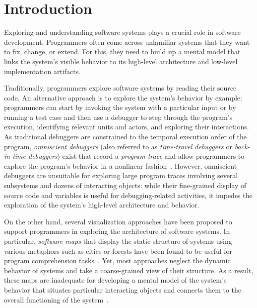 \section{Introduction}
\label{sec:introduction}

Exploring and understanding software systems plays a crucial role in software development.
Programmers often come across unfamiliar systems that they want to fix, change, or extend.
For this, they need to build up a mental model that links the system's visible behavior to its high-level architecture and low-level implementation artifacts.

Traditionally, programmers explore software systems by reading their source code.
An alternative approach is to explore the system's behavior by example:
programmers can start by invoking the system with a particular input or by running a test case and then use a debugger to step through the program's execution, identifying relevant units and actors, and exploring their interactions.
As traditional debuggers are constrained to the temporal execution order of the program, \emph{omniscient debuggers} (also referred to as \emph{time-travel debuggers} or \emph{back-in-time debuggers}) exist that record a \emph{program trace} and allow programmers to explore the program's behavior in a nonlinear fashion~\cite{lewis2003debugging,hofer2006design,pothier2009back,lienhard2008practical}.
However, omniscient debuggers are unsuitable for exploring large program traces involving several subsystems and dozens of interacting objects:
while their fine-grained display of source code and variables is useful for debugging-related activities, it impedes the exploration of the system's high-level architecture and behavior.

On the other hand, several visualization approaches have been proposed to support programmers in exploring the architecture of software systems.
In particular, \emph{software maps} that display the static structure of systems using various metaphors such as cities or forests have been found to be useful for program comprehension tasks~\cite{wettel2007visualizing,atzberger2021softwareforest,limberger2022visual}.
Yet, most approaches neglect the dynamic behavior of systems and take a coarse-grained view of their structure.
As a result, these maps are inadequate for developing a mental model of the system's behavior that situates particular interacting objects and connects them to the overall functioning of the system~\cite{vonMayrhauser1995program}.

